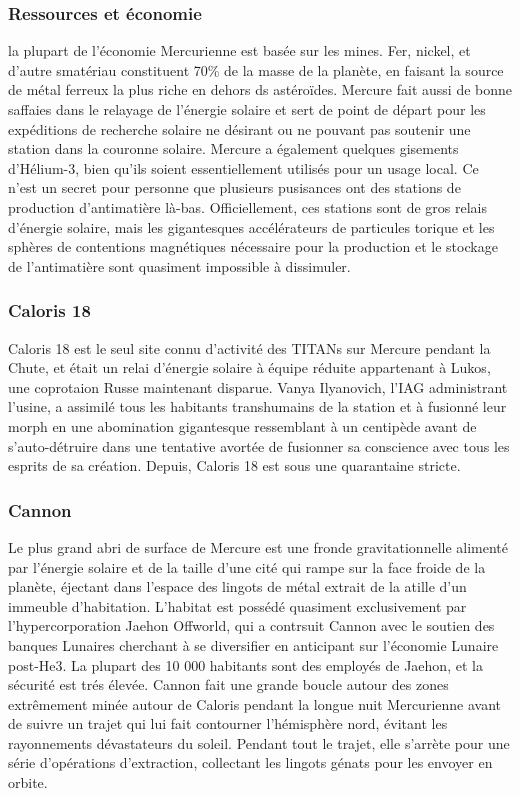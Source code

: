 \subsubsection{Ressources et économie} \label{sec:resources-and-economics} 

la plupart de l'économie Mercurienne est basée sur les mines. Fer, nickel, et d'autre smatériau constituent 70\% de la masse de la planète, en faisant la source de métal ferreux la plus riche en dehors ds astéroïdes. Mercure fait aussi de bonne saffaies dans le relayage de l'énergie solaire et sert de point de départ pour les expéditions de recherche solaire ne désirant ou ne pouvant pas soutenir une station dans la couronne solaire. Mercure a également quelques gisements d'Hélium-3, bien qu'ils soient essentiellement utilisés pour un usage local. Ce n'est un secret pour personne que plusieurs pusisances ont des stations de production d'antimatière là-bas. Officiellement, ces stations sont de gros relais d'énergie solaire, mais les gigantesques accélérateurs de particules torique et les sphères de contentions magnétiques nécessaire pour la production et le stockage de l'antimatière sont quasiment impossible à dissimuler. 

\subsubsection{Caloris 18} \label{sec:caloris-18} 

Caloris 18 est le seul site connu d'activité des TITANs sur Mercure pendant la Chute, et était un relai d'énergie solaire à équipe réduite appartenant à Lukos, une coprotaion Russe maintenant disparue. Vanya Ilyanovich, l'IAG administrant l'usine, a assimilé tous les habitants transhumains de la station et à fusionné leur morph en une abomination gigantesque ressemblant à un centipède avant de s'auto-détruire dans une tentative avortée de fusionner sa conscience avec tous les esprits de sa création. Depuis, Caloris 18 est sous une quarantaine stricte. 

\subsubsection{Cannon} \label{sec:cannon} 

Le plus grand abri de surface de Mercure est une fronde gravitationnelle alimenté par l'énergie solaire et de la taille d'une cité qui rampe sur la face froide de la planète, éjectant dans l'espace des lingots de métal extrait de la atille d'un immeuble d'habitation. L'habitat est possédé quasiment exclusivement par l'hypercorporation Jaehon Offworld, qui a contrsuit Cannon avec le soutien des banques Lunaires cherchant à se diversifier en anticipant sur l'économie Lunaire post-He3. La plupart des 10 000 habitants sont des employés de Jaehon, et la sécurité est trés élevée. Cannon fait une grande boucle autour des zones extrêmement minée autour de Caloris pendant la longue nuit Mercurienne avant de suivre un trajet qui lui fait contourner l'hémisphère nord, évitant les rayonnements dévastateurs du soleil. Pendant tout le trajet, elle s'arrète pour une série d'opérations d'extraction, collectant les lingots génats pour les envoyer en orbite. 

